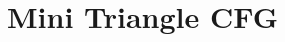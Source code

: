 \appendix


\chapter{Mini Triangle CFG}
\label{bil:minitriangle}



\label{FIRSTAPPENDIX} %



%

\label{LASTAPPENDIX}
